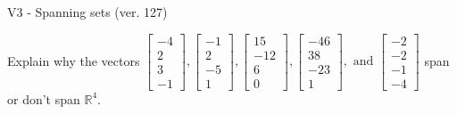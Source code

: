 \begin{exercise}
  \begin{exerciseTitle}V3 - Spanning sets (ver. 127)\end{exerciseTitle}
  \begin{exerciseStatement}
    Explain why the vectors \(\left[\begin{array}{r}
-4 \\
2 \\
3 \\
-1
\end{array}\right] , \left[\begin{array}{r}
-1 \\
2 \\
-5 \\
1
\end{array}\right] , \left[\begin{array}{r}
15 \\
-12 \\
6 \\
0
\end{array}\right] , \left[\begin{array}{r}
-46 \\
38 \\
-23 \\
1
\end{array}\right] , \text{ and } \left[\begin{array}{r}
-2 \\
-2 \\
-1 \\
-4
\end{array}\right]\) span or don't span \(\mathbb{R}^4\). 
	



\end{exerciseStatement}
\end{exercise}

